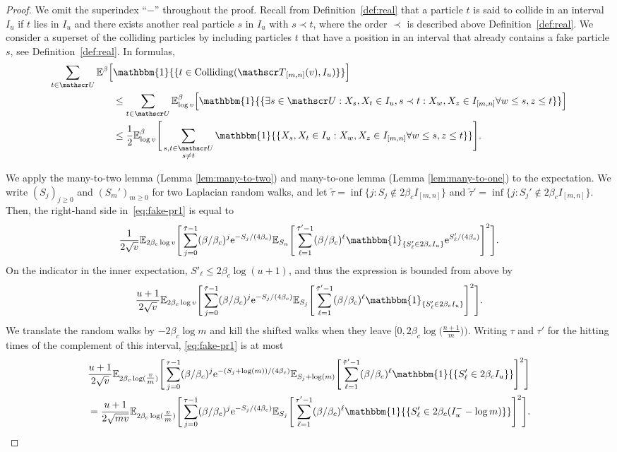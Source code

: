 \documentclass[a4paper, a4wide, 10pt, reqno]{amsart}
\theoremstyle{plain}
\theoremstyle{definition}
\numberwithin{equation}{section}
\newcommand{\E}{\mathbb E}
\newcommand{\sT}{{\mathscr T}}
\newcommand{\sU}{{\mathscr U}}
\newcommand{\re}{{\mathrm e}}
\newcommand{\ind}[1]{\mathbbm{1}_{\{#1\}}}
\newcommand{\Ind}[1]{\mathbbm{1}{\{#1\}}}
\begin{document}
\begin{proof}
We omit the superindex ``$-$'' throughout the proof.
    Recall from Definition~\ref{def:real} that a particle $t$ is said to collide in an interval $I_u$ if $t$ lies in $I_u$ and there exists another real particle $s$ in $I_u$ with $s \prec t$, where the order $\prec$ is described above Definition~\ref{def:real}. 
    We consider a superset of the colliding particles by including particles $t$ that have a position in an interval that already contains a fake particle $s$, see Definition~\ref{def:real}. 
    In formulas, 
   \begin{align}
   \sum_{t\in \sU}\E^{\beta}\Big[&\Ind{t\in \mathrm{Colliding}(\sT_{[m,n]}(v),I_u)}\Big]  \nonumber\\&\le  
   \sum_{t\in \sU}\E^{\beta}_{\log v}\Big[\Ind{\exists s\in \sU: X_{s}, X_t\in I_u, s\prec t: X_w, X_z\in I_{[m,n]} \forall w\le s, z\le t}\Big] \nonumber\\
   &\le \frac{1}{2}\E^{\beta}_{\log v}\Bigg[\sum_{\substack{s,t\in \sU\\s\neq t}}\Ind{ X_{s}, X_t\in I_u: X_w, X_z\in I_{[m,n]} \forall w\le s, z\le t}\Bigg].\label{eq:fake-pr1}
   \end{align}
   
   We apply the many-to-two lemma (Lemma \ref{lem:many-to-two}) and many-to-one lemma (Lemma \ref{lem:many-to-one}) to the expectation. 
   We write $(S_j)_{j\ge 0}$ and $(S_m')_{m\ge 0}$ for two Laplacian random walks, and let $\tilde \tau=\inf\{j: S_j\notin 2\beta_c I_{[m,n]}\}$ and $\tilde \tau'=\inf\{j: S_j'\notin 2\beta_cI_{[m,n]}\}$. Then, the right-hand side in~\eqref{eq:fake-pr1} is equal to 
   \[
   \frac{1}{2\sqrt{v}}\E_{2\beta_c\log v}\Bigg[\sum_{j=0}^{\tilde \tau-1}(\beta/\beta_c)^j \re^{-S_j/(4\beta_c)}\E_{S_n}\Bigg[\sum_{\ell=1}^{\tilde \tau'-1}(\beta/\beta_c)^\ell\ind{S_\ell'\in 2\beta_c I_u}\re^{S_\ell'/(4\beta_c)}\Bigg]^2\Bigg].
   \]
   On the indicator in the inner expectation, $S'_\ell\le 2\beta_c\log(u+1)$, and thus the expression is bounded from above by 
   \[
   \frac{u+1}{2\sqrt{v}}\E_{2\beta_c\log v}\Bigg[\sum_{j=0}^{\tilde\tau-1}(\beta/\beta_c)^j \re^{-S_j/(4\beta_c)}\E_{S_j}\Bigg[\sum_{\ell=1}^{\tilde\tau'-1}(\beta/\beta_c)^\ell\ind{S_\ell'\in 2\beta_c I_u}\Bigg]^2\Bigg].
   \]
   We translate the random walks by $-2\beta_c\log m$ and kill the shifted walks when they leave $\big[0,2\beta_c\log\big(\tfrac{n+1}m\big)\big)$. Writing $ \tau$ and $ \tau'$ for the hitting times of the complement of this interval, \eqref{eq:fake-pr1} is at most
   \begin{align*}
   &\frac{u+1}{2\sqrt{v}}\E_{2\beta_c\log (\tfrac vm)}\Bigg[\sum_{j=0}^{\tau-1}(\beta/\beta_c)^j \re^{-(S_j+\log(m))/(4\beta_c)}\E_{S_j+\log(m)}\Bigg[\sum_{\ell=1}^{\tilde\tau'-1}(\beta/\beta_c)^\ell\Ind{S_\ell'\in 2\beta_c I_u}\Bigg]^2\Bigg]\\
  &=\frac{u+1}{2\sqrt{mv}}\E_{2\beta_c\log (\tfrac{v}{m})}\Bigg[\sum_{j=0}^{\tau-1}(\beta/\beta_c)^j \re^{-S_j/(4\beta_c)}\E_{S_j}\Bigg[\sum_{\ell=1}^{\tau'-1}(\beta/\beta_c)^\ell\Ind{S_\ell'\in 2\beta_c(I^-_u-\log m)}\Bigg]^2\Bigg].\qedhere
  \end{align*}
\end{proof}
\end{document}
